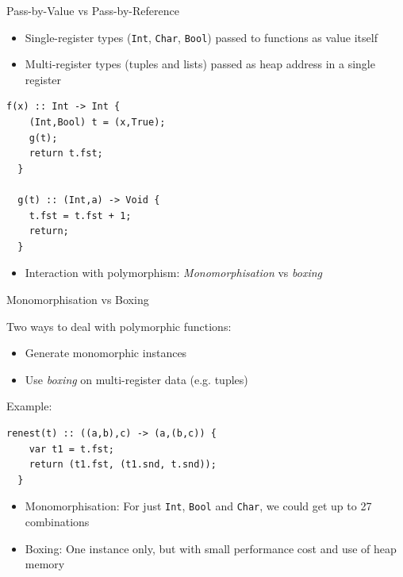 \documentclass[dvipsnames,aspectratio=169]{beamer}
\begin{document}
\begin{frame}[fragile]{Pass-by-Value vs Pass-by-Reference}

  \begin{itemize}
    \item Single-register types (\texttt{Int}, \texttt{Char}, \texttt{Bool})
          passed to functions as value itself
    \item Multi-register types (tuples and lists) passed as heap address
          in a single register
  \end{itemize}

\begin{lstlisting}[language=spl]
  f(x) :: Int -> Int {
    (Int,Bool) t = (x,True);
    g(t);
    return t.fst;
  }

  g(t) :: (Int,a) -> Void {
    t.fst = t.fst + 1;
    return;
  }
\end{lstlisting}\vspace{-6mm}
%
\begin{itemize}
  \item Interaction with polymorphism: \emph{Monomorphisation} vs \emph{boxing}
\end{itemize}

\end{frame}


\begin{frame}[fragile]{Monomorphisation vs Boxing}

  Two ways to deal with polymorphic functions:
  \begin{itemize}
    \item Generate monomorphic instances
    \item Use \emph{boxing} on multi-register data (e.g. tuples)
  \end{itemize}

Example:

\begin{lstlisting}[language=spl]
  renest(t) :: ((a,b),c) -> (a,(b,c)) {
    var t1 = t.fst;
    return (t1.fst, (t1.snd, t.snd));
  }
\end{lstlisting}\vspace{-4mm}

\begin{itemize}
  \item Monomorphisation: For just \texttt{Int}, \texttt{Bool} and
        \texttt{Char}, we could get up to 27 combinations
  \item Boxing: One instance only, but with small performance
        cost and use of heap memory
\end{itemize}

\end{frame}
\end{document}
